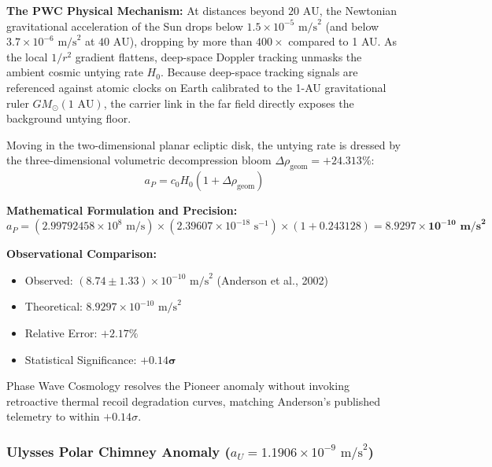 \documentclass[11pt,a4paper]{article}
\begin{document}
\textbf{The PWC Physical Mechanism:}  
At distances beyond $20\text{ AU}$, the Newtonian gravitational acceleration of the Sun drops below $1.5 \times 10^{-5}\text{ m/s}^2$ (and below $3.7 \times 10^{-6}\text{ m/s}^2$ at $40\text{ AU}$), dropping by more than $400\times$ compared to 1 AU. As the local $1/r^2$ gradient flattens, deep-space Doppler tracking unmasks the ambient cosmic untying rate $H_0$. Because deep-space tracking signals are referenced against atomic clocks on Earth calibrated to the 1-AU gravitational ruler $GM_\odot(1\text{ AU})$, the carrier link in the far field directly exposes the background untying floor.

Moving in the two-dimensional planar ecliptic disk, the untying rate is dressed by the three-dimensional volumetric decompression bloom $\Delta\rho_{\text{geom}} = +24.313\%$:
\begin{equation}
a_P = c_0 H_0 (1 + \Delta\rho_{\text{geom}})
\label{eq:a_p_pwc}
\end{equation}

\textbf{Mathematical Formulation and Precision:}  
\begin{equation}
a_P = (2.99792458 \times 10^8\text{ m/s}) \times (2.39607 \times 10^{-18}\text{ s}^{-1}) \times (1 + 0.243128) = \mathbf{8.9297 \times 10^{-10}\text{ m/s}^2}
\end{equation}

\textbf{Observational Comparison:}  
\begin{itemize}
    \item Observed: $(8.74 \pm 1.33) \times 10^{-10}\text{ m/s}^2$ (Anderson et al., 2002)
    \item Theoretical: $8.9297 \times 10^{-10}\text{ m/s}^2$
    \item Relative Error: $+2.17\%$
    \item Statistical Significance: $\mathbf{+0.14\sigma}$
\end{itemize}

Phase Wave Cosmology resolves the Pioneer anomaly without invoking retroactive thermal recoil degradation curves, matching Anderson's published telemetry to within $+0.14\sigma$.

\subsubsection{Ulysses Polar Chimney Anomaly (\texorpdfstring{$a_U = 1.1906 \times 10^{-9}\text{ m/s}^2$}{aU = 1.191e-09 m/s\textasciicircum 2})}
\label{subsubsec:ulysses_anomaly}
\end{document}
